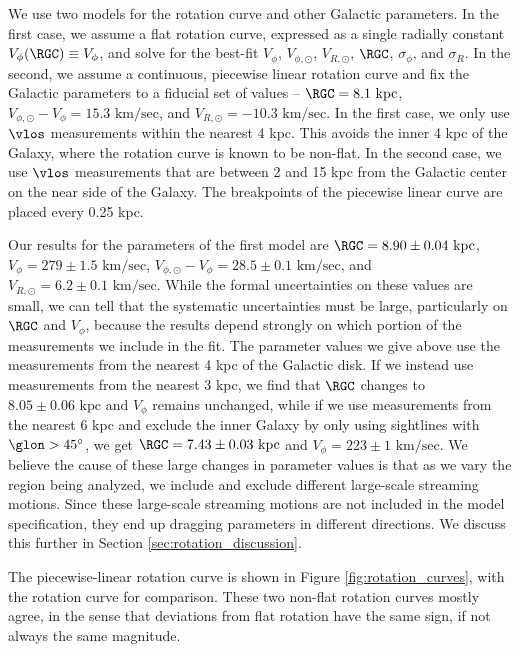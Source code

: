 We use two models for the rotation curve and other Galactic parameters. 
In the first case, we assume a flat rotation curve, expressed as a single radially constant $V_\phi(\RGC) \equiv V_\phi$, and solve for the best-fit $V_\phi$, $V_{\phi, \odot}$, $V_{R, \odot}$, $\RGC$, $\sigma_\phi$, and $\sigma_R$. 
In the second, we assume a continuous, piecewise linear rotation curve and fix the Galactic parameters to a fiducial set of values -- $\RGC = 8.1\text{ kpc}$, $V_{\phi, \odot} - V_{\phi} = 15.3 \text{ km/sec}$, and $V_{R, \odot} = - 10.3 \text{ km/sec}$. 
In the first case, we only use $\vlos$ measurements within the nearest 4 kpc.
This avoids the inner 4 kpc of the Galaxy, where the rotation curve is known to be non-flat.
In the second case, we use $\vlos$ measurements that are between 2 and 15 kpc from the Galactic center on the near side of the Galaxy. 
The breakpoints of the piecewise linear curve are placed every 0.25 kpc.

Our results for the parameters of the first model are $\RGC=8.90 \pm 0.04 \text{ kpc}$, $V_\phi = 279 \pm 1.5 \text{ km/sec}$, $V_{\phi, \odot} - V_\phi = 28.5 \pm 0.1 \text{ km/sec}$, and $V_{R, \odot} = 6.2 \pm 0.1 \text{ km/sec}$.
While the formal uncertainties on these values are small, we can tell that the systematic uncertainties must be large, particularly on $\RGC$ and $V_\phi$, because the results depend strongly on which portion of the measurements we include in the fit.
The parameter values we give above use the measurements from the nearest 4 kpc of the Galactic disk.
If we instead use measurements from the nearest 3 kpc, we find that $\RGC$ changes to $8.05 \pm 0.06 \text{ kpc}$ and $V_\phi$ remains unchanged, while if we use measurements from the nearest 6 kpc and exclude the inner Galaxy by only using sightlines with $\glon > 45^\circ$, we get $\RGC = 7.43 \pm 0.03 \text{ kpc}$ and $V_\phi = 223 \pm 1 \text{ km/sec}$.
We believe the cause of these large changes in parameter values is that as we vary the region being analyzed, we include and exclude different large-scale streaming motions. 
Since these large-scale streaming motions are not included in the model specification, they end up dragging parameters in different directions.
We discuss this further in Section \ref{sec:rotation_discussion}.

The piecewise-linear rotation curve is shown in Figure \ref{fig:rotation_curves}, with the \Clemens rotation curve for comparison. 
These two non-flat rotation curves mostly agree, in the sense that deviations from flat rotation have the same sign, if not always the same magnitude.

